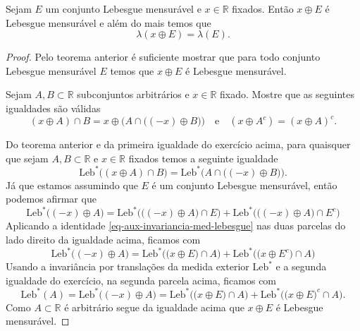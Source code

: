 \begin{teorema}
Sejam $E$ um conjunto Lebesgue mensurável e $x\in\mathbb{R}$
fixados. Então $x\oplus E$ é Lebesgue mensurável e além do 
mais temos que 
\[
\lambda(x\oplus E)= \lambda(E).
\]
\end{teorema}

\begin{proof}
Pelo teorema anterior é suficiente mostrar que 
para todo conjunto Lebesgue mensurável $E$ temos 
que $x\oplus E$ é Lebesgue mensurável.
\begin{exercicio}
Sejam $A,B\subset \mathbb{R}$ subconjuntos arbitrários
e $x\in\mathbb{R}$ fixado. Mostre que as seguintes igualdades
são válidas
\[
(x\oplus A)\cap B 
= 
x\oplus 
\Big(A\cap \big((-x)\oplus B\big)\Big)
\quad\text{e}\quad
(x\oplus A^c) = (x\oplus A)^c.
\]
\end{exercicio}
Do teorema anterior e da primeira igualdade do exercício 
acima, para quaisquer que sejam $A,B\subset \mathbb{R}$ 
e $x\in\mathbb{R}$ fixados temos a seguinte igualdade  
\begin{equation}\label{eq-aux-invariancia-med-lebesgue}
\mathrm{Leb}^*\big((x\oplus A)\cap B\big)
= 
\mathrm{Leb}^*
\Big(A\cap \big((-x)\oplus B\big)\Big).
\end{equation}
Já que estamos assumindo que $E$ 
é um conjunto Lebesgue mensurável, então 
podemos afirmar que 
\[
\mathrm{Leb}^*\big((-x)\oplus A\big)
=
\mathrm{Leb}^*\Big( \big((-x)\oplus A\big) \cap E\Big)
+
\mathrm{Leb}^*\Big( \big((-x)\oplus A\big) \cap E^c\Big)
\]
Aplicando a identidade 
\eqref{eq-aux-invariancia-med-lebesgue} nas duas parcelas
do lado direito da igualdade acima, ficamos com 
\[
\mathrm{Leb}^*\big((-x)\oplus A\big)
=
\mathrm{Leb}^*\Big( \big(x\oplus E\big) \cap A\Big)
+
\mathrm{Leb}^*\Big( \big(x\oplus E^c\big) \cap A\Big)
\]
Usando a invariância por translações da medida exterior 
$\mathrm{Leb}^*$ e a segunda igualdade do exercício,
na segunda parcela acima, ficamos com 
\[
\mathrm{Leb}^*(A)
=
\mathrm{Leb}^*\big((-x)\oplus A\big)
=
\mathrm{Leb}^*\Big( \big(x\oplus E\big) \cap A\Big)
+
\mathrm{Leb}^*\Big( \big(x\oplus E\big)^c \cap A\Big).
\]
Como $A\subset \mathbb{R}$ é arbitrário segue da igualdade acima que 
$x\oplus E$ é Lebesgue mensurável.
\end{proof}